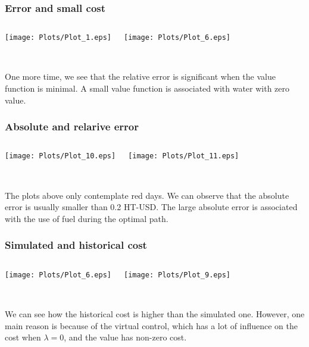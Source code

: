 \documentclass[aspectratio=169]{beamer}
\begin{document}
\begin{frame}
\frametitle{Error and small cost}
\begin{columns}[c]

\texttt{[image: Plots/Plot\_1.eps]}

\texttt{[image: Plots/Plot\_6.eps]}

\end{columns}
\quad\\
One more time, we see that the relative error is significant when the value function is minimal. A small value function is associated with water with zero value.
\end{frame}


\begin{frame}
\frametitle{Absolute and relarive error}
\begin{columns}[c]

\texttt{[image: Plots/Plot\_10.eps]}

\texttt{[image: Plots/Plot\_11.eps]}

\end{columns}
\quad\\
\alert{The plots above only contemplate red days}. We can observe that the absolute error is usually smaller than 0.2 HT-USD. The large absolute error is associated with the use of fuel during the optimal path.

\end{frame}


\begin{frame}
\frametitle{Simulated and historical cost}
\begin{columns}[c]

\texttt{[image: Plots/Plot\_6.eps]}

\texttt{[image: Plots/Plot\_9.eps]}

\end{columns}
\quad\\
We can see how the historical cost is higher than the simulated one. However, one main reason is because of the virtual control, which has a lot of influence on the cost when $\lambda=0$, and the value has non-zero cost.

\end{frame}
\end{document}
